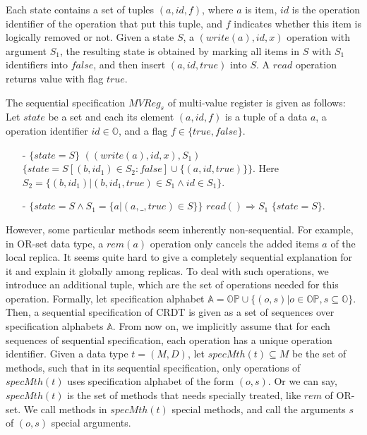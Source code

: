Each state contains a set of tuples $(a,\mathit{id},f)$, where $a$ is item, $\mathit{id}$ is the operation identifier of the operation that put this tuple, and $f$ indicates whether this item is logically removed or not. Given a state $S$, a $(write(a),\mathit{id},x)$ operation with argument $S_1$, the resulting state is obtained by marking all items in $S$ with $S_1$ identifiers into $\mathit{false}$, and then insert $(a,id,\mathit{true})$ into $S$. A $\mathit{read}$ operation returns value with flag $\mathit{true}$. 


\begin{example}
\label{definition:sequential specification of multi-value register} 
The sequential specification $\mathit{MVReg}_s$ of multi-value register is given as follows: Let $\mathit{state}$ be a set and each its element $(a,\mathit{id},f)$ is a tuple of a data $a$, a operation identifier $\mathit{id} \in \mathbb{O}$, and a flag $f \in \{ \mathit{true},\mathit{false} \}$. 
\begin{itemize}
\setlength{\itemsep}{0.5pt}
\item[-] $\{ \mathit{state} = S \}$ $((write(a),\mathit{id},x),S_1)$ $\{ \mathit{state} = S[(b,\mathit{id}_1) \in S_2 : \mathit{false}] 
\cup 
\{ (a,id,\mathit{true}) \} 
\}$. Here $S_2 = \{ (b,\mathit{id}_1) \vert (b,\mathit{id}_1,\mathit{true}) \in S_1 \wedge id \in S_1 \}$. 
\item[-] $\{ \mathit{state} = S \wedge S_1 = \{ a \vert (a,\_,\mathit{true}) \in S \} \}$ $read() \Rightarrow S_1$ $\{ \mathit{state} = S \}$. 
\end{itemize}
\end{example}



However, some particular methods seem inherently non-sequential. For example, in OR-set data type, a $rem(a)$ operation only cancels the added items $a$ of the local replica. It seems quite hard to give a completely sequential explanation for it and explain it globally among replicas. To deal with such operations, we introduce an additional tuple, which are the set of operations needed for this operation. Formally, let specification alphabet $\mathbb{A} = \mathbb{OP} \cup \{ (o,s) \vert o \in \mathbb{OP}, s \subseteq \mathbb{O} \}$. Then, a sequential specification of CRDT is given as a set of sequences over specification alphabets $\mathbb{A}$. From now on, we implicitly assume that for each sequences of sequential specification, each operation has a unique operation identifier. Given a data type $t = (M,D)$, let $\mathit{specMth}(t) \subseteq M$ be the set of methods, such that in its sequential specification, only operations of $\mathit{specMth}(t)$ uses specification alphabet of the form $(o,s)$. Or we can say, $\mathit{specMth}(t)$ is the set of methods that needs specially treated, like $rem$ of OR-set. We call methods in $\mathit{specMth}(t)$ special methods, and call the arguments $s$ of $(o,s)$ special arguments.





